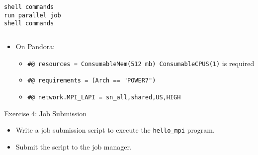 \documentclass[slidestop,mathserif,compress,xcolor=svgnames,table]{beamer}
\newenvironment{ablock}[0]
{
\begin{beamerboxesrounded}[upper=uppercol,lower=lowercol,shadow=true]}
{\end{beamerboxesrounded}}
\newenvironment{bblock}[0]
{
\begin{beamerboxesrounded}[upper=uppercol1,lower=lowercol1,shadow=true]}
{\end{beamerboxesrounded}}
\newenvironment{eblock}[0]
{
\begin{beamerboxesrounded}[upper=uppercol2,lower=lowercol2,shadow=true]}
{\end{beamerboxesrounded}}
\begin{document}
\begin{frame}
\begin{columns}
\begin{ablock}{}
{\begin{verbatim}
shell commands
run parallel job
shell commands
\end{verbatim}
}
\end{ablock}
\end{columns}
\newpage
\begin{bblock}{}
\begin{itemize}
\item On Pandora: 
\begin{itemize}
\item \texttt{\#@ resources = ConsumableMem(512 mb) ConsumableCPUS(1)} is required
\item \texttt{\#@ requirements = (Arch == "POWER7")}
\item \texttt{\#@ network.MPI\_LAPI = sn\_all,shared,US,HIGH}
\end{itemize}
\end{itemize}
\end{bblock}
\end{frame}

\begin{frame}
 \begin{eblock}{Exercise 4: Job Submission}
  \begin{itemize}
   \item Write a job submission script to execute the \texttt{hello\_mpi} program.
   \item Submit the script to the job manager.
  \end{itemize}
 \end{eblock}

\end{frame}
\end{document}

